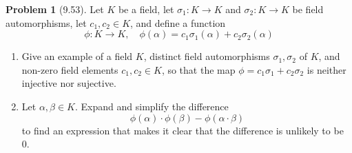 \documentclass[12pt]{article}
\theoremstyle{definition}
\newtheorem{problem}{Problem}
\begin{document}
\begin{problem}[9.53]
    Let $K$ be a field, let $\sigma_1 : K \longrightarrow K$ and $\sigma_2 : K \longrightarrow K$ be field automorphisms,
    let $c_1, c_2 \in K$, and define a function
    \[
        \phi : K \longrightarrow K, \quad \phi(\alpha) = c_1\sigma_1(\alpha) + c_2\sigma_2(\alpha)
    \]
    \begin{enumerate}[label=(\alph*)]
        \item Give an example of a field $K$, distinct field automorphisms $\sigma_1, \sigma_2$ of $K$, and non-zero field
              elements $c_1, c_2 \in K$, so that the map $\phi = c_1\sigma_1 + c_2\sigma_2$ is neither injective nor sujective.
        \begin{solution}

        \end{solution}

        \item Let $\alpha, \beta \in K$. Expand and simplify the difference
              \[
                    \phi(\alpha) \cdot \phi(\beta) - \phi(\alpha \cdot \beta)
              \]
              to find an expression that makes it clear that the difference is unlikely to be 0.
        \begin{solution}

        \end{solution}
    \end{enumerate}
\end{problem}
\end{document}
